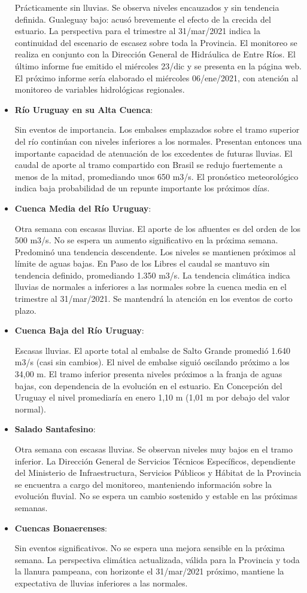 \begin{itemize}
  Prácticamente sin lluvias. Se observa niveles encauzados y sin
  tendencia definida. Gualeguay bajo: acusó brevemente el efecto de la
  crecida del estuario. La perspectiva para el trimestre al 31/mar/2021
  indica la continuidad del escenario de escasez sobre toda la
  Provincia. El monitoreo se realiza en conjunto con la Dirección
  General de Hidráulica de Entre Ríos. El último informe fue emitido el
  miércoles 23/dic y se presenta en la página web. El próximo informe
  sería elaborado el miércoles 06/ene/2021, con atención al monitoreo de
  variables hidrológicas regionales.
\item
  \textbf{Río Uruguay en su Alta Cuenca}:

  Sin eventos de importancia. Los embalses emplazados sobre el tramo
  superior del río continúan con niveles inferiores a los normales.
  Presentan entonces una importante capacidad de atenuación de los
  excedentes de futuras lluvias. El caudal de aporte al tramo compartido
  con Brasil se redujo fuertemente a menos de la mitad, promediando unos
  650 m3/s. El pronóstico meteorológico indica baja probabilidad de un
  repunte importante los próximos días.
\item
  \textbf{Cuenca Media del Río Uruguay}:

  Otra semana con escasas lluvias. El aporte de los afluentes es del
  orden de los 500 m3/s. No se espera un aumento significativo en la
  próxima semana. Predominó una tendencia descendente. Los niveles se
  mantienen próximos al límite de aguas bajas. En Paso de los Libres el
  caudal se mantuvo sin tendencia definido, promediando 1.350 m3/s. La
  tendencia climática indica lluvias de normales a inferiores a las
  normales sobre la cuenca media en el trimestre al 31/mar/2021. Se
  mantendrá la atención en los eventos de corto plazo.
\item
  \textbf{Cuenca Baja del Río Uruguay}:

  Escasas lluvias. El aporte total al embalse de Salto Grande promedió
  1.640 m3/s (casi sin cambios). El nivel de embalse siguió oscilando
  próximo a los 34,00 m. El tramo inferior presenta niveles próximos a
  la franja de aguas bajas, con dependencia de la evolución en el
  estuario. En Concepción del Uruguay el nivel promediaría en enero 1,10
  m (1,01 m por debajo del valor normal).
\item
  \textbf{Salado Santafesino}:

  Otra semana con escasas lluvias. Se observan niveles muy bajos en el
  tramo inferior. La Dirección General de Servicios Técnicos
  Específicos, dependiente del Ministerio de Infraestructura, Servicios
  Públicos y Hábitat de la Provincia se encuentra a cargo del monitoreo,
  manteniendo información sobre la evolución fluvial. No se espera un
  cambio sostenido y estable en las próximas semanas.
\item
  \textbf{Cuencas Bonaerenses}:

  Sin eventos significativos. No se espera una mejora sensible en la
  próxima semana. La perspectiva climática actualizada, válida para la
  Provincia y toda la llanura pampeana, con horizonte el 31/mar/2021
  próximo, mantiene la expectativa de lluvias inferiores a las normales.
\end{itemize}
